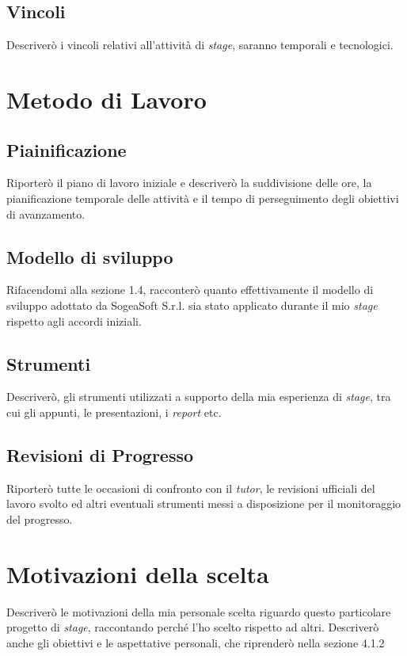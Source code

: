        \subsection{Vincoli}
        Descriverò i vincoli relativi all'attività di \textit{stage}, saranno temporali e tecnologici. 

    \section{Metodo di Lavoro}
        \subsection{Piainificazione}
        Riporterò il piano di lavoro iniziale e descriverò la suddivisione delle ore, la pianificazione temporale delle attività e il tempo di perseguimento degli obiettivi di avanzamento. 
        \subsection{Modello di sviluppo}
        Rifacendomi alla sezione 1.4, racconterò quanto effettivamente il modello di sviluppo adottato da SogeaSoft S.r.l. sia stato applicato durante il mio \textit{stage} rispetto agli accordi iniziali. 
        \subsection{Strumenti}
        Descriverò, gli strumenti utilizzati a supporto della mia esperienza di \textit{stage}, tra cui gli appunti, le presentazioni, i \textit{report} etc. 
        \subsection{Revisioni di Progresso}
        Riporterò tutte le occasioni di confronto con il \textit{tutor}, le revisioni ufficiali del lavoro svolto ed altri eventuali strumenti messi a disposizione per il monitoraggio del progresso. 
    \section{Motivazioni della scelta}
    Descriverò le motivazioni della mia personale scelta riguardo questo particolare progetto di \textit{stage}, raccontando perché l'ho scelto rispetto ad altri. Descriverò anche gli obiettivi e le aspettative personali, che riprenderò nella sezione 4.1.2
    
        